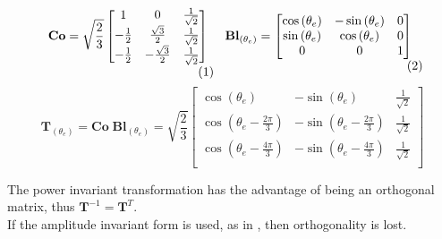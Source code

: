 \begin{subequations}
	\begin{minipage}{.4\linewidth}
		\begin{equation}
			\mathbf{Co} = \sqrt{\frac{2}{3}}
			\begin{bmatrix}
				1            & 0                   & \frac{1}{\sqrt{2}} \\
				-\frac{1}{2} & \frac{\sqrt{3}}{2}  & \frac{1}{\sqrt{2}} \\
				-\frac{1}{2} & -\frac{\sqrt{3}}{2} & \frac{1}{\sqrt{2}} \\
			\end{bmatrix}
			\label{eq:concordia1}
		\end{equation}
	\end{minipage}
	\begin{minipage}{.485\linewidth}
		\begin{equation}
			\mathbf{Bl}_{(\theta_e)} = 	\begin{bmatrix}
				\cos{\left(\theta_e\right)} & -\sin{\left(\theta_e\right)} & 0 \\
				\sin{\left(\theta_e\right)} & \cos{\left(\theta_e\right)}  & 0 \\
				0                           & 0                            & 1 \\
			\end{bmatrix}
			\label{eq:blondel_park}
		\end{equation}
	\end{minipage}
\end{subequations}
\begin{equation}
	\mathbf{T}_{(\theta_e)} = \mathbf{Co} \; \mathbf{Bl}_{(\theta_e)}
	=
	\sqrt{\frac{2}{3}}
	\begin{bmatrix}
		\cos{\left(\theta_e\right)}                & -\sin{\left(\theta_e\right)}                & \frac{1}{\sqrt{2}} \\
		\cos{\left(\theta_e-\frac{2\pi}{3}\right)} & -\sin{\left(\theta_e-\frac{2\pi}{3}\right)} & \frac{1}{\sqrt{2}} \\
		\cos{\left(\theta_e-\frac{4\pi}{3}\right)} & -\sin{\left(\theta_e-\frac{4\pi}{3}\right)} & \frac{1}{\sqrt{2}} \\
	\end{bmatrix}
	\label{eq:dq0}
\end{equation}

The power invariant transformation has the advantage of being an orthogonal matrix, thus $\mathbf{T}^{-1} = \mathbf{T}^T$.\\
If the amplitude invariant form is used, as in , then orthogonality is lost.

